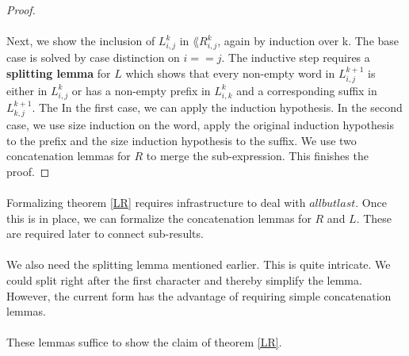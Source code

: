 \begin{proof}
    \paragraph{}
    Next, we show the inclusion of $L^k_{i,j}$ in $\lang{R^k_{i,j}}$, again by induction over k. 
    The base case is solved by case distinction on $i==j$. 
    The inductive step requires a \textbf{splitting lemma} for $L$ which shows that every non-empty word in $L^{k+1}_{i,j}$ is either in $L^k_{i,j}$ or has a non-empty prefix in $L^k_{i,k}$ and a corresponding suffix in $L^{k+1}_{k,j}$.
    The 
    In the first case, we can apply the induction hypothesis. 
    In the second case, we use size induction on the word, apply the original induction hypothesis to the prefix and the size induction hypothesis to the suffix. 
    We use two concatenation lemmas for $R$ to merge the sub-expression. 
    This finishes the proof.
\end{proof}

\paragraph{}
Formalizing theorem \ref{LR} requires infrastructure to deal with $allbutlast$. 
Once this is in place, we can formalize the concatenation lemmas for $R$ and $L$.
These are required later to connect sub-results. 


\paragraph{}
We also need the splitting lemma mentioned earlier.
This is quite intricate. We could split right after the first character and thereby simplify the lemma. 
However, the current form has the advantage of requiring simple concatenation lemmas.


\paragraph{}
These lemmas suffice to show the claim of theorem \ref{LR}.


\paragraph{} 





